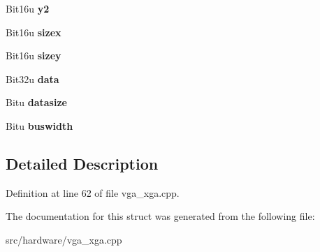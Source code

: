 \begin{DoxyCompactItemize}
\item 
\hypertarget{structXGAStatus_1_1XGA__WaitCmd_ab9bcc545ecc01bb494716738168089ff}{Bit16u {\bfseries y2}}\label{structXGAStatus_1_1XGA__WaitCmd_ab9bcc545ecc01bb494716738168089ff}

\item 
\hypertarget{structXGAStatus_1_1XGA__WaitCmd_a0334f34bd13e0ef7198428612462b1fc}{Bit16u {\bfseries sizex}}\label{structXGAStatus_1_1XGA__WaitCmd_a0334f34bd13e0ef7198428612462b1fc}

\item 
\hypertarget{structXGAStatus_1_1XGA__WaitCmd_a27dadd7afe9c6d45fea96ef375054706}{Bit16u {\bfseries sizey}}\label{structXGAStatus_1_1XGA__WaitCmd_a27dadd7afe9c6d45fea96ef375054706}

\item 
\hypertarget{structXGAStatus_1_1XGA__WaitCmd_a1366d1faf2b1cd431633ea69592d0d41}{Bit32u {\bfseries data}}\label{structXGAStatus_1_1XGA__WaitCmd_a1366d1faf2b1cd431633ea69592d0d41}

\item 
\hypertarget{structXGAStatus_1_1XGA__WaitCmd_ad3d9d7d24214284ce548b5f9545907f2}{Bitu {\bfseries datasize}}\label{structXGAStatus_1_1XGA__WaitCmd_ad3d9d7d24214284ce548b5f9545907f2}

\item 
\hypertarget{structXGAStatus_1_1XGA__WaitCmd_a435cd3a1e0268480bf38007fbfc8a018}{Bitu {\bfseries buswidth}}\label{structXGAStatus_1_1XGA__WaitCmd_a435cd3a1e0268480bf38007fbfc8a018}

\end{DoxyCompactItemize}


\subsection{Detailed Description}


Definition at line 62 of file vga\-\_\-xga.\-cpp.



The documentation for this struct was generated from the following file\-:\begin{DoxyCompactItemize}
\item 
src/hardware/vga\-\_\-xga.\-cpp\end{DoxyCompactItemize}
